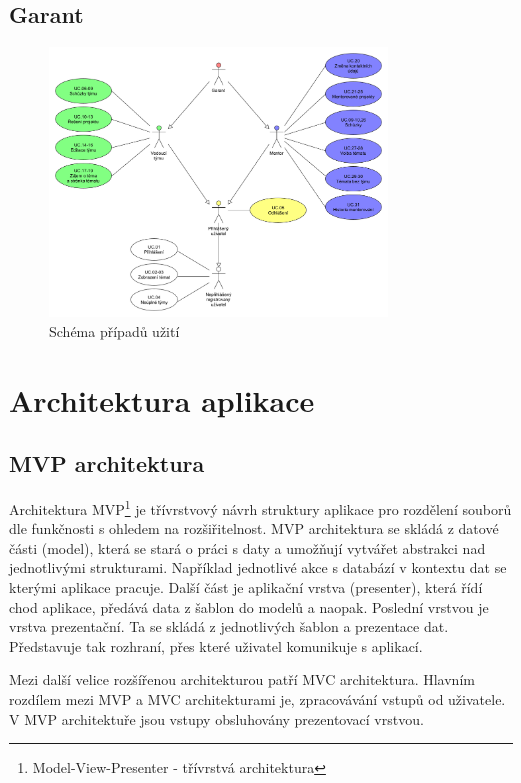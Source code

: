 \documentclass[czech,BP]{thesiskiv}
\begin{document}
		\subsection{Garant}
		\begin{figure}[h]
			\centering
			\includegraphics[width=0.8\textwidth]{img/use_case/use_case_diagram}
			\caption{Schéma případů užití}
		\end{figure}
	\section{Architektura aplikace}
		\subsection{MVP architektura}
		\par Architektura MVP\footnote{Model-View-Presenter - třívrstvá architektura} je třívrstvový návrh struktury aplikace pro rozdělení souborů dle funkčnosti s ohledem na rozšiřitelnost. MVP architektura se skládá z datové části (model), která se stará o práci s daty a umožňují vytvářet abstrakci nad jednotlivými strukturami. Například jednotlivé akce s databází v kontextu dat se kterými aplikace pracuje. Další část je aplikační vrstva (presenter), která řídí chod aplikace, předává data z šablon do modelů a naopak. Poslední vrstvou je vrstva prezentační. Ta se skládá z jednotlivých šablon a prezentace dat. Představuje tak rozhraní, přes které uživatel komunikuje s aplikací.
		\par Mezi další velice rozšířenou architekturou patří MVC architektura. Hlavním rozdílem mezi MVP a MVC architekturami je, zpracovávání vstupů od uživatele. V MVP architektuře jsou vstupy obsluhovány prezentovací vrstvou.
\end{document}
